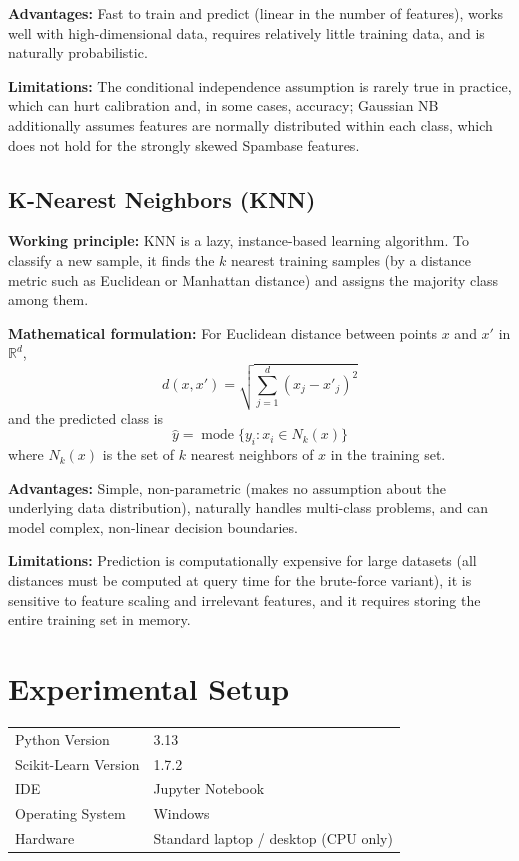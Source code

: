 \documentclass[12pt,a4paper]{article}
\begin{document}
\textbf{Advantages:} Fast to train and predict (linear in the number of features), works well with high-dimensional data, requires relatively little training data, and is naturally probabilistic.

\textbf{Limitations:} The conditional independence assumption is rarely true in practice, which can hurt calibration and, in some cases, accuracy; Gaussian NB additionally assumes features are normally distributed within each class, which does not hold for the strongly skewed Spambase features.

\subsection*{K-Nearest Neighbors (KNN)}
\textbf{Working principle:} KNN is a lazy, instance-based learning algorithm. To classify a new sample, it finds the $k$ nearest training samples (by a distance metric such as Euclidean or Manhattan distance) and assigns the majority class among them.

\textbf{Mathematical formulation:} For Euclidean distance between points $x$ and $x'$ in $\mathbb{R}^d$,
\begin{equation}
d(x, x') = \sqrt{\sum_{j=1}^{d} (x_j - x'_j)^2}
\end{equation}
and the predicted class is
\begin{equation}
\hat{y} = \operatorname{mode}\{ y_i : x_i \in N_k(x) \}
\end{equation}
where $N_k(x)$ is the set of $k$ nearest neighbors of $x$ in the training set.

\textbf{Advantages:} Simple, non-parametric (makes no assumption about the underlying data distribution), naturally handles multi-class problems, and can model complex, non-linear decision boundaries.

\textbf{Limitations:} Prediction is computationally expensive for large datasets (all distances must be computed at query time for the brute-force variant), it is sensitive to feature scaling and irrelevant features, and it requires storing the entire training set in memory.

\section{Experimental Setup}
\begin{tabular}{ll}
\toprule
Python Version & 3.13 \\
Scikit-Learn Version & 1.7.2 \\
IDE & Jupyter Notebook \\
Operating System & Windows \\
Hardware & Standard laptop / desktop (CPU only) \\
\bottomrule
\end{tabular}
\end{document}
